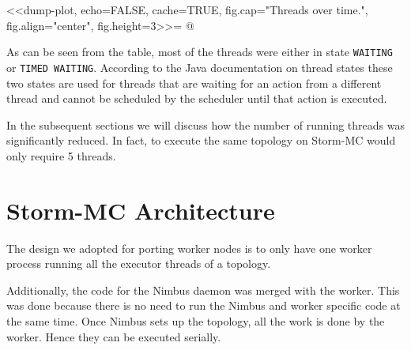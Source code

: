 <<dump-plot, echo=FALSE, cache=TRUE, fig.cap="Threads over time.", fig.align="center", fig.height=3>>=
@

As can be seen from the table, most of the threads were either in state \texttt{WAITING} or \texttt{TIMED WAITING}. According to the Java documentation on thread states \cite{JavaThreads} these two states are used for threads that are waiting for an action from a different thread and cannot be scheduled by the scheduler until that action is executed.

In the subsequent sections we will discuss how the number of running threads was significantly reduced. In fact, to execute the same topology on Storm-MC would only require 5 threads.



\section{Storm-MC Architecture}
\label{sec:storm_mc_arch}


The design we adopted for porting worker nodes is to only have one worker process running all the executor threads of a topology.

Additionally, the code for the Nimbus daemon was merged with the worker. This was done because there is no need to run the Nimbus and worker specific code at the same time. Once Nimbus sets up the topology, all the work is done by the worker. Hence they can be executed serially.

